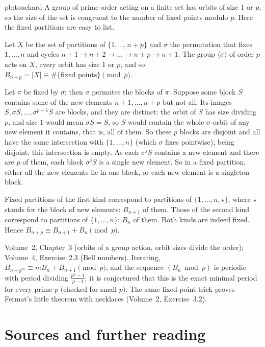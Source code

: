 \begin{solution}{pb:touchard}
\idea A group of prime order acting on a finite set has orbits of size $1$ or $p$, so the size of the set is congruent to the
number of fixed points modulo $p$. Here the fixed partitions are easy to list.

\writeup Let $X$ be the set of partitions of $\{1,\dots,n+p\}$ and $\sigma$ the permutation that fixes $1,\dots,n$ and cycles
$n+1\to n+2\to\dots\to n+p\to n+1$. The group $\langle\sigma\rangle$ of order $p$ acts on $X$, every orbit has size $1$ or $p$, and so
$B_{n+p}=|X|\equiv\#\{\text{fixed points}\}\pmod p$.

Let $\pi$ be fixed by $\sigma$; then $\sigma$ permutes the blocks of $\pi$. Suppose some block $S$ contains some of the new elements
$n+1,\dots,n+p$ but not all. Its images $S,\sigma S,\dots,\sigma^{p-1}S$ are blocks, and they are distinct: the orbit of $S$ has size
dividing $p$, and size $1$ would mean $\sigma S=S$, so $S$ would contain the whole $\sigma$-orbit of any new element it contains,
that is, all of them. So these $p$ blocks are disjoint and all have the same intersection with $\{1,\dots,n\}$ (which $\sigma$ fixes
pointwise); being disjoint, this intersection is empty. As each $\sigma^jS$ contains a new element and there are $p$ of them,
each block $\sigma^jS$ is a single new element. So in a fixed partition, either all the new elements lie in one block, or each
new element is a singleton block.

Fixed partitions of the first kind correspond to partitions of $\{1,\dots,n,\star\}$, where $\star$ stands for the block of new
elements: $B_{n+1}$ of them. Those of the second kind correspond to partitions of $\{1,\dots,n\}$: $B_n$ of them. Both kinds are
indeed fixed. Hence $B_{n+p}\equiv B_{n+1}+B_n\pmod p$.

\tools Volume~2, Chapter~3 (orbits of a group action, orbit sizes divide the order); Volume~4, Exercise~2.3 (Bell numbers).
\leads Iterating, $B_{n+p^m}\equiv mB_n+B_{n+1}\pmod p$, and the sequence $(B_n\bmod p)$ is periodic with period dividing
$\frac{p^p-1}{p-1}$; it is conjectured that this is the exact minimal period for every prime $p$ (checked for small $p$). The same
fixed-point trick proves Fermat's little theorem with necklaces (Volume~2, Exercise~3.2).
\end{solution}

\section*{Sources and further reading}

